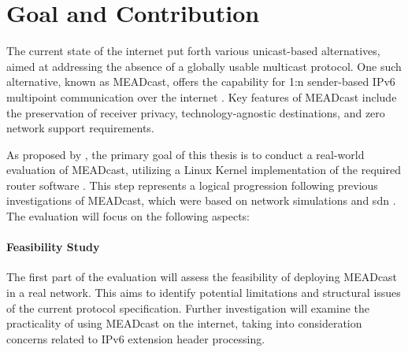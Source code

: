 \section{Goal and Contribution} %
\label{sec:Contribution}



The current state of the internet put forth various unicast-based alternatives,
    aimed at addressing the absence of a globally usable multicast protocol.
One such alternative, known as MEADcast, offers the capability for 1:n
    sender-based IPv6 multipoint communication over the internet
    \cite{meadcast1, meadcast2}.
Key features of MEADcast include the preservation of receiver privacy,
    technology-agnostic destinations, and zero network support requirements.

As proposed by \citeauthor{meadcast2}, the primary goal of this thesis is to
    conduct a real-world evaluation of MEADcast, utilizing a Linux Kernel
    implementation of the required router software \cite{meadcast2}.
This step represents a logical progression following previous investigations of
    MEADcast, which were based on network simulations \cite{meadcast1} and
    \gls{sdn} \cite{sdn_ba}.
The evaluation will focus on the following aspects:

\paragraph{Feasibility Study} %
\label{par:Feasibility Study}
The first part of the evaluation will assess the feasibility of deploying
    MEADcast in a real network.
This aims to identify potential limitations and structural issues of the
    current protocol specification.
Further investigation will examine the practicality of using MEADcast on the
    internet, taking into consideration concerns related to IPv6 extension
    header processing.

